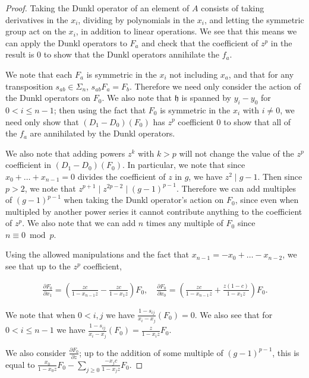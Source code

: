 \documentclass{article}
\numberwithin{equation}{section}
\begin{document}
\begin{proof}
Taking the Dunkl operator of an element of $A$ consists of taking derivatives in the $x_i$, dividing by polynomials in the $x_i$, and letting the symmetric group act on the $x_i$, in addition to linear operations. We see that this means we can apply the Dunkl operators to $F_a$ and check that the coefficient of $z^p$ in the result is $0$ to show that the Dunkl operators annihilate the $f_a$.

We note that each $F_a$ is symmetric in the $x_i$ not including $x_a$, and that for any transposition $s_{ab} \in \Sigma_n$, $s_{ab}F_a=F_b$. Therefore we need only consider the action of the Dunkl operators on $F_0$. We also note that $\mathfrak{h}$ is spanned by $y_i-y_0$ for $0 < i \le n-1$; then using the fact that $F_0$ is symmetric in the $x_i$ with $i \ne 0$, we need only show that $(D_1-D_0)(F_0)$ has $z^p$ coefficient $0$ to show that all of the $f_a$ are annihilated by the Dunkl operators. 

We also note that adding powers $z^k$ with $k > p$ will not change the value of the $z^p$ coefficient in $(D_1-D_0)(F_0)$. In particular, we note that since $x_0+\dots+x_{n-1}=0$ divides the coefficient of $z$ in $g$, we have $z^2 \mid g-1$. Then since $p>2$, we note that $z^{p+1} \mid z^{2p-2} \mid (g-1)^{p-1}$. Therefore we can add multiples of $(g-1)^{p-1}$ when taking the Dunkl operator's action on $F_0$, since even when multipled by another power series it cannot contribute anything to the coefficient of $z^p$. We also note that we can add $n$ times any multiple of $F_0$ since $n \equiv 0 \bmod p$. 

Using the allowed manipulations and the fact that $x_{n-1}=-x_0+\dots-x_{n-2}$, we see that up to the $z^p$ coefficient,

\begin{align*}
\frac{\partial F_0}{\partial x_1}=\left(\frac{zc}{1-x_{n-1}z}-\frac{zc}{1-x_1z}\right)F_0, \quad \frac{\partial F_0}{\partial x_0}=\left(\frac{zc}{1-x_{n-1}z}+\frac{z(1-c)}{1-x_1z}\right)F_0.
\end{align*}

We note that when $0 < i,j$ we have $\frac{1-s_{ij}}{x_i-x_j}\left(F_0\right)=0$. We also see that for $0 < i \le n-1$ we have $\frac{1-s_{ij}}{x_i-x_j}\left(F_0\right)=\frac{z}{1-x_iz}F_0$. 

We also consider $\frac{\partial F_0}{\partial z}$; up to the addition of some multiple of $(g-1)^{p-1}$, this is equal to $\frac{x_0}{1-x_0z}F_0-\sum_{j \ge 0} \frac{-x_jc}{1-x_jz}F_0$. 


\end{proof}
\end{document}
